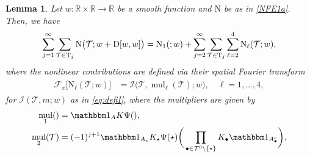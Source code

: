 \documentclass[%
11pt,  reqno]{amsart}
\makeatletter
\newcommand{\5}{\textup{V}}
\newcommand{\ind}{\mathbbm 1}
\newtheorem{lemma}[theorem]{Lemma}
\theoremstyle{remark}
\newcommand{\R}{\mathbb{R}}
\newcommand{\bul}{\bullet}
\newcommand{\TT}{\mathcal{T}}
\newcommand{\Tr}{\mathrm{T}}
\newcommand{\bfrak}{\mathfrak{b}}
\newcommand{\gfrak}{\mathfrak{g}}
\newcommand{\Ft}{{\mathcal{F}}}
\renewcommand{\l}{\ell}
\DeclareMathOperator{\mul}{mul}
\def\<#1>{\csname MH@symb@#1\endcsname}
\newcommand{\Ical}{\mathcal{I}}
\numberwithin{equation}{section}
\numberwithin{theorem}{section}
\newcommand{\NN}{\mathrm{N}}
\newcommand{\D}{\mathrm{D}}
\makeatother
\begin{document}
\begin{lemma}
\label{LEM:wint}
Let $w:\R \times \R\to \R$ be a smooth function and $\NN$ be as in \eqref{NFE1a}.
Then, we have
\begin{align}
\label{wint0a}
\sum_{j=1}^\infty \sum_{\TT\in \Tr_j} \NN\big(\TT; w+
\D[w, w]
\big)
=
\NN_1(\<1>;w) + \sum_{j=2}^\infty \sum_{\TT\in\Tr_j} \sum_{\ell=2}^4  \NN_\ell(\TT; w),
\end{align}
where the nonlinear contributions are defined via their spatial Fourier transform
\begin{align}
\label{wint0b}
\begin{split}
\Ft_x \big[ \NN_\ell (\TT; w) \big] & =
\Ical \big(\TT, {\mul}_\l(\TT); w \big),\quad \l=1,\dots, 4,
\end{split}
\end{align}
for $\Ical(\TT, m; w)$ as in \eqref{eq:defiI}, 
%
where the multipliers are given by %
\begin{align}
    \mul_1(\<1>)&= \ind_A K \Psi(\<1>),\\
    \mul_2(\TT)&=(-1)^{j+1} \ind_{A_\star} K_\star\Psi(\star) \bigg( \prod_{\bul \in \TT^0 \setminus\{\star\}}  K_\bul  \ind_{A_\bul^c} \bigg), 

\end{align}
\end{lemma}
\end{document}
